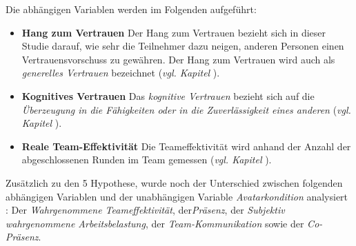 \documentclass[a4paper,11pt]{article}%
\renewcommand{\\}{\vspace*{0.5\baselineskip} \newline}
\begin{document}
Die abhängigen Variablen werden im Folgenden aufgeführt:
\begin{itemize}
\item \textbf{Hang zum Vertrauen} Der Hang zum Vertrauen bezieht sich in dieser Studie darauf, wie sehr die Teilnehmer dazu neigen, anderen Personen einen Vertrauensvorschuss zu gewähren. Der Hang zum Vertrauen wird auch als \textit{generelles Vertrauen} bezeichnet \citep[S.30]{mcallister1995affect} (\textit{vgl. Kapitel }).
\item \textbf{Kognitives Vertrauen} Das \textit{kognitive Vertrauen} bezieht sich auf die \textit{Überzeugung in die Fähigkeiten oder in die Zuverlässigkeit eines anderen} \citep[S.30]{mcallister1995affect} (\textit{vgl. Kapitel }).
\item \textbf{Reale Team-Effektivität} Die Teameffektivität wird anhand der Anzahl der abgeschlossenen Runden im Team gemessen (\textit{vgl. Kapitel }).
\end{itemize}

Zusätzlich zu den 5 Hypothese, wurde noch der Unterschied zwischen folgenden abhängigen Variablen und der unabhängigen Variable \textit{Avatarkondition} analysiert : Der \textit{Wahrgenommene Teameffektivität}, der\textit{Präsenz}, der \textit{Subjektiv wahrgenommene Arbeitsbelastung}, der \textit{Team-Kommunikation} sowie der \textit{Co-Präsenz}.
				
\end{document}

